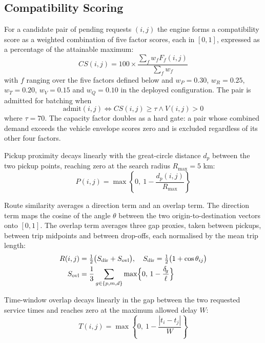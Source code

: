 \documentclass[conference]{IEEEtran}
\begin{document}
\subsection{Compatibility Scoring}
For a candidate pair of pending requests $(i, j)$ the engine forms a compatibility score as a weighted combination of five factor scores, each in $[0, 1]$, expressed as a percentage of the attainable maximum:
\begin{equation}
CS(i,j) = 100 \times \frac{\sum_f w_f F_f(i,j)}{\sum_f w_f}
\end{equation}
with $f$ ranging over the five factors defined below and $w_P = 0.30$, $w_R = 0.25$, $w_T = 0.20$, $w_V = 0.15$ and $w_Q = 0.10$ in the deployed configuration. The pair is admitted for batching when
\begin{equation}
\text{admit}(i, j) \iff CS(i,j) \ge \tau \land V(i,j) > 0
\end{equation}
where $\tau = 70$. The capacity factor doubles as a hard gate: a pair whose combined demand exceeds the vehicle envelope scores zero and is excluded regardless of its other four factors.

Pickup proximity decays linearly with the great-circle distance $d_p$ between the two pickup points, reaching zero at the search radius $R_{\text{max}} = 5$ km:
\begin{equation}
P(i, j) = \max\left\{0, \: 1 - \frac{d_p(i,j)}{R_{\text{max}}}\right\}
\end{equation}

Route similarity averages a direction term and an overlap term. The direction term maps the cosine of the angle $\theta$ between the two origin-to-destination vectors onto $[0, 1]$. The overlap term averages three gap proxies, taken between pickups, between trip midpoints and between drop-offs, each normalised by the mean trip length:
\begin{equation}
\begin{aligned}
R(i, j) &= \tfrac{1}{2}\big(S_{\text{dir}} + S_{\text{ovl}}\big), \quad S_{\text{dir}} = \tfrac{1}{2}\big(1 + \cos\theta_{ij}\big) \\
S_{\text{ovl}} &= \frac{1}{3} \sum_{g \in \{p, m, d\}} \max\Bigl\{0, \, 1 - \frac{\delta_{\!g}}{\ell}\Bigr\}
\end{aligned}
\end{equation}

Time-window overlap decays linearly in the gap between the two requested service times and reaches zero at the maximum allowed delay $W$:
\begin{equation}
T(i, j) = \max\left\{0, \: 1 - \frac{|t_i - t_j|}{W}\right\}
\end{equation}
\end{document}
